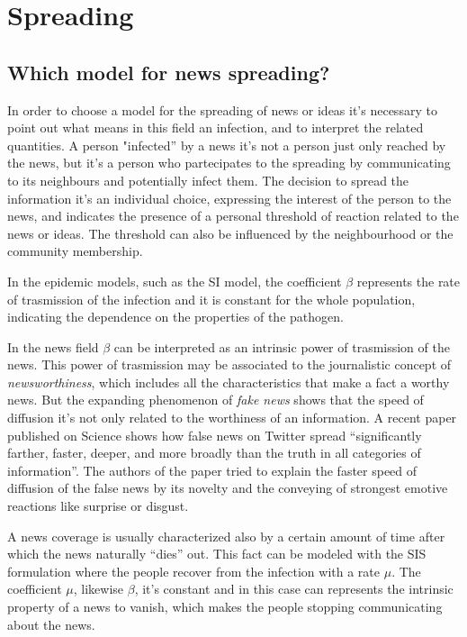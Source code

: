 \chapter{Spreading} %
\label{cha:spreading}

\section{Which model for news spreading?}

In order to choose a model for the spreading of news or ideas it's necessary to point out
what means in this field an infection, and to interpret the related quantities.
A person "infected'' by a news it's not a person just only reached by the news, but it's a person
who partecipates to the spreading by communicating to its neighbours and potentially infect them.
The decision to spread the information it's an individual choice, expressing the interest
of the person to the news, and indicates the presence of a personal threshold of reaction related to the news or ideas.
The threshold can also be influenced by the neighbourhood or the community membership.


In the epidemic models, such as the SI model, the coefficient $\beta$ represents the rate of trasmission of the infection and it is constant for the whole population, indicating the dependence on the properties of the pathogen.

In the news field $\beta$ can be interpreted as an intrinsic power of trasmission of the news.
This power of trasmission may be associated to the journalistic concept of \textit{newsworthiness},
which includes all the characteristics that make a fact a worthy news.
But the expanding phenomenon of \textit{fake news} shows that the speed of diffusion it's not only related to
the worthiness of an information. A recent paper published on Science \cite{Vosoughi_2018} shows how false news on Twitter spread 
``significantly farther, faster, deeper, and more broadly than the truth in all categories of information''.
The authors of the paper tried to explain the faster speed of diffusion of the false news by its novelty and the conveying
of strongest emotive reactions like surprise or disgust.


A news coverage is usually characterized also by a certain amount of time after which the news naturally ``dies'' out.
This fact can be modeled with the SIS formulation where the people recover from the infection with a rate $\mu$.
The coefficient $\mu$, likewise $\beta$, it's constant and in this case can represents the intrinsic property of a news to vanish,
which makes the people stopping communicating about the news.


